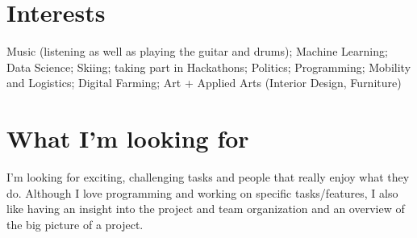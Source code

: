\documentclass{article}
\begin{document}
\vspace{.9em}
\section{Interests}

Music (listening as well as playing the guitar and drums); Machine Learning; Data Science; Skiing; taking part in Hackathons; Politics; Programming; Mobility and Logistics; Digital Farming; Art + Applied Arts (Interior Design, Furniture)

\vspace{.9em}
\section{What I'm looking for}
I'm looking for exciting, challenging tasks and people that really enjoy what they do. Although I love programming and working on specific tasks/features, I also like having an insight into the project and team organization and an overview of the big picture of a project.
\end{document}
